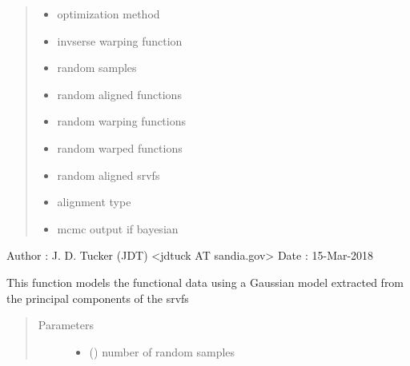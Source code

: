 \documentclass[letterpaper,10pt,english]{sphinxmanual}
\begin{document}
\begin{fulllineitems}
\begin{quote}
\begin{description}
\begin{itemize}
\item {} 
 \textendash{} optimization method

\item {} 
 \textendash{} invserse warping function

\item {} 
 \textendash{} random samples

\item {} 
 \textendash{} random aligned functions

\item {} 
 \textendash{} random warping functions

\item {} 
 \textendash{} random warped functions

\item {} 
 \textendash{} random aligned srvfs

\item {} 
 \textendash{} alignment type

\item {} 
 \textendash{} mcmc output if bayesian

\end{itemize}

\end{description}\end{quote}

Author :  J. D. Tucker (JDT) \textless{}jdtuck AT sandia.gov\textgreater{}
Date   :  15-Mar-2018

\begin{fulllineitems}
\label{\detokenize{time_warping:time_warping.fdawarp.gauss_model}}
This function models the functional data using a Gaussian model
extracted from the principal components of the srvfs
\begin{quote}\begin{description}
\item[{Parameters}] \leavevmode\begin{itemize}
\item {} 
 () \textendash{} number of random samples


\end{itemize}
\end{description}
\end{quote}
\end{fulllineitems}
\end{fulllineitems}
\end{document}
